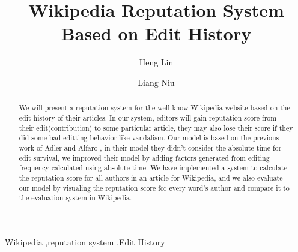 \documentclass[preprint,review,12pt]{elsarticle}
\begin{document}
\begin{frontmatter}


\title{Wikipedia Reputation System Based on Edit History}




\author[label1]{Heng Lin}
\author[label2]{Liang Niu}
\address[label1]{hl2521@nyu.edu}
\address[label2]{ln932@nyu.edu}

\begin{abstract}
  We will present a reputation system for the well know Wikipedia website based
  on the edit history of their articles. In our system, editors will gain
  reputation score from their edit(contribution) to some particular article,
  they may also lose their score if they did some bad editting behavior like
  vandalism\cite{adler2007content}. Our model is based on the previous work of Adler and
  Alfaro \cite{adler2007content} , in their model they didn't consider the
  absolute time for edit survival, we improved their model by adding factors
  generated from editing frequency calculated using absolute time.
  We have implemented a system to calculate the reputation score for all authors
  in an article for Wikipedia, and we also evaluate our model by visualing the
  reputation score for every word's author and compare it to the evaluation
  system in Wikipedia.
\end{abstract}

\begin{keyword}
Wikipedia \sep reputation system \sep Edit History


\end{keyword}

\end{frontmatter}
\end{document}
